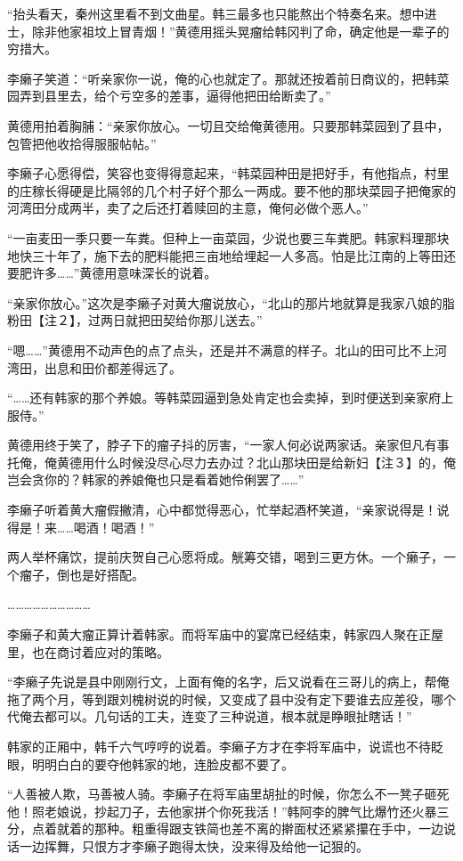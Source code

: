 “抬头看天，秦州这里看不到文曲星。韩三最多也只能熬出个特奏名来。想中进士，除非他家祖坟上冒青烟！”黄德用摇头晃瘤给韩冈判了命，确定他是一辈子的穷措大。

李癞子笑道：“听亲家你一说，俺的心也就定了。那就还按着前日商议的，把韩菜园弄到县里去，给个亏空多的差事，逼得他把田给断卖了。”

黄德用拍着胸脯：“亲家你放心。一切且交给俺黄德用。只要那韩菜园到了县中，包管把他收拾得服服帖帖。”

李癞子心愿得偿，笑容也变得得意起来，“韩菜园种田是把好手，有他指点，村里的庄稼长得硬是比隔邻的几个村子好个那么一两成。要不他的那块菜园子把俺家的河湾田分成两半，卖了之后还打着赎回的主意，俺何必做个恶人。”

“一亩麦田一季只要一车粪。但种上一亩菜园，少说也要三车粪肥。韩家料理那块地快三十年了，施下去的肥料能把三亩地给埋起一人多高。怕是比江南的上等田还要肥许多……”黄德用意味深长的说着。

“亲家你放心。”这次是李癞子对黄大瘤说放心，“北山的那片地就算是我家八娘的脂粉田【注２】，过两日就把田契给你那儿送去。”

“嗯……”黄德用不动声色的点了点头，还是并不满意的样子。北山的田可比不上河湾田，出息和田价都差得远了。

“……还有韩家的那个养娘。等韩菜园逼到急处肯定也会卖掉，到时便送到亲家府上服侍。”

黄德用终于笑了，脖子下的瘤子抖的厉害，“一家人何必说两家话。亲家但凡有事托俺，俺黄德用什么时候没尽心尽力去办过？北山那块田是给新妇【注３】的，俺岂会贪你的？韩家的养娘俺也只是看着她伶俐罢了……”

李癞子听着黄大瘤假撇清，心中都觉得恶心，忙举起酒杯笑道，“亲家说得是！说得是！来……喝酒！喝酒！”

两人举杯痛饮，提前庆贺自己心愿将成。觥筹交错，喝到三更方休。一个癞子，一个瘤子，倒也是好搭配。

…………………………

李癞子和黄大瘤正算计着韩家。而将军庙中的宴席已经结束，韩家四人聚在正屋里，也在商讨着应对的策略。

“李癞子先说是县中刚刚行文，上面有俺的名字，后又说看在三哥儿的病上，帮俺拖了两个月，等到跟刘槐树说的时候，又变成了县中没有定下要谁去应差役，哪个代俺去都可以。几句话的工夫，连变了三种说道，根本就是睁眼扯瞎话！”

韩家的正厢中，韩千六气哼哼的说着。李癞子方才在李将军庙中，说谎也不待眨眼，明明白白的要夺他韩家的地，连脸皮都不要了。

“人善被人欺，马善被人骑。李癞子在将军庙里胡扯的时候，你怎么不一凳子砸死他！照老娘说，抄起刀子，去他家拼个你死我活！”韩阿李的脾气比爆竹还火暴三分，点着就着的那种。粗重得跟支铁简也差不离的擀面杖还紧紧攥在手中，一边说话一边挥舞，只恨方才李癞子跑得太快，没来得及给他一记狠的。

